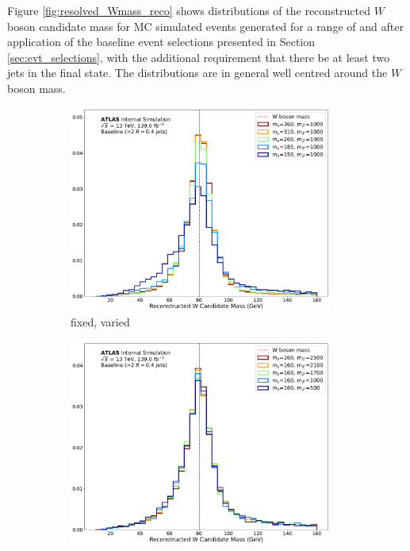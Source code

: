 Figure \ref{fig:resolved_Wmass_reco} shows distributions of the reconstructed \(W\) boson candidate mass for MC simulated events generated for a range of \ms and \mZp after application of the baseline event selections presented in Section \ref{sec:evt_selections}, with the additional requirement that there be at least two \smallR jets in the final state. The distributions are in general well centred around the \(W\) boson mass.

\begin{figure}[h]
	\centering
	\begin{subfigure}[b]{0.49\textwidth}
	\includegraphics[width=0.95\textwidth]{Figures/5/WCand_m_ms.pdf}
	\caption{\mZp fixed, \ms varied}
	\label{fig:resolved_Wmass_reco_ms}
	\end{subfigure}
	\begin{subfigure}[b]{0.49\textwidth}
	\includegraphics[width=0.95\textwidth]{Figures/5/WCand_m_mZp.pdf}

\end{subfigure}
\end{figure}
